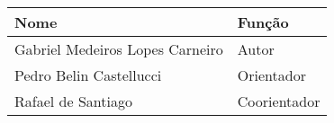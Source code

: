 \begin{table}[!h]
    \centering
    \begin{tabular}{|l|l|}
        \hline
        \textbf{Nome}                   & \textbf{Função}   \\
        \hline
        Gabriel Medeiros Lopes Carneiro & Autor             \\
        \hline
        Pedro Belin Castellucci         & Orientador        \\
        \hline
        Rafael de Santiago              & Coorientador      \\
        \hline
    \end{tabular}
    \label{tab:table}
\end{table}